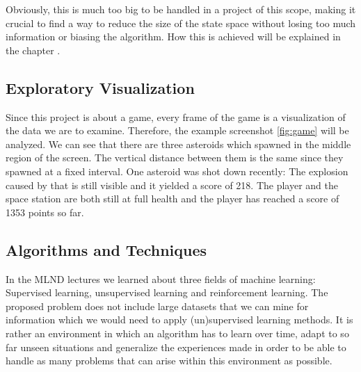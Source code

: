 \documentclass[a4paper,10pt]{article}
\begin{document}
Obviously, this is much too big to be handled in a project of this scope, making it crucial to find a way to reduce the size of the state space without losing too much information or biasing the algorithm.
How this is achieved will be explained in the chapter .


\subsection{Exploratory Visualization}

Since this project is about a game, every frame of the game is a visualization of the data we are to examine.
Therefore, the example screenshot \ref{fig:game} will be analyzed.
We can see that there are three asteroids which spawned in the middle region of the screen.
The vertical distance between them is the same since they spawned at a fixed interval.
One asteroid was shot down recently: The explosion caused by that is still visible and it yielded a score of 218.
The player and the space station are both still at full health and the player has reached a score of 1353 points so far.
\subsection{Algorithms and Techniques}
\label{algorithms}

In the MLND lectures we learned about three fields of machine learning: Supervised learning, unsupervised learning and reinforcement learning.
The proposed problem does not include large datasets that we can mine for information which we would need to apply (un)supervised learning methods. 
It is rather an environment in which an algorithm has to learn over time, adapt to so far unseen  situations and generalize the experiences made in order to be able to handle as many problems that can arise within this environment as possible.
\end{document}
